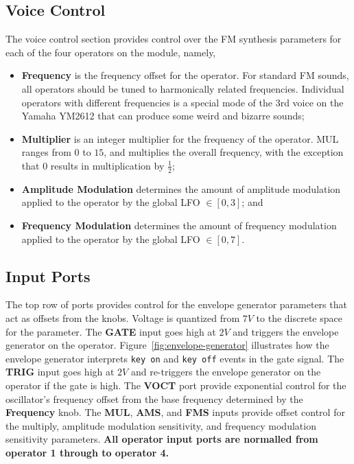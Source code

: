 \documentclass[12pt,letter]{article}
\begin{document}
\subsection{Voice Control}

The voice control section provides control over the FM synthesis parameters for each of the four operators on the module, namely,

\begin{itemize}
 \item \textbf{Frequency} is the frequency offset for the operator. For standard FM sounds, all operators should be tuned to harmonically related frequencies. Individual operators with different frequencies is a special mode of the 3rd voice on the Yamaha YM2612 that can produce some weird and bizarre sounds;
 \item \textbf{Multiplier} is an integer multiplier for the frequency of the operator. MUL ranges from $0$ to $15$, and multiplies the overall frequency, with the exception that $0$ results in multiplication by $\frac{1}{2}$;
 \item \textbf{Amplitude Modulation} determines the amount of amplitude modulation applied to the operator by the global LFO $\in [0, 3]$; and
 \item \textbf{Frequency Modulation} determines the amount of frequency modulation applied to the operator by the global LFO $\in [0, 7]$.
\end{itemize}

\subsection{Input Ports}

The top row of ports provides control for the envelope generator parameters that act as offsets from the knobs. Voltage is quantized from $7V$ to the discrete space for the parameter. The \textbf{GATE} input goes high at $2V$ and triggers the envelope generator on the operator. Figure~\ref{fig:envelope-generator} illustrates how the envelope generator interprets \texttt{key on} and \texttt{key off} events in the gate signal. The \textbf{TRIG} input goes high at $2V$ and re-triggers the envelope generator on the operator if the gate is high. The \textbf{VOCT} port provide exponential control for the oscillator's frequency offset from the base frequency determined by the \textbf{Frequency} knob. The \textbf{MUL}, \textbf{AMS}, and \textbf{FMS} inputs provide offset control for the multiply, amplitude modulation sensitivity, and frequency modulation sensitivity parameters. \textbf{All operator input ports are normalled from operator 1 through to operator 4.}
\end{document}
